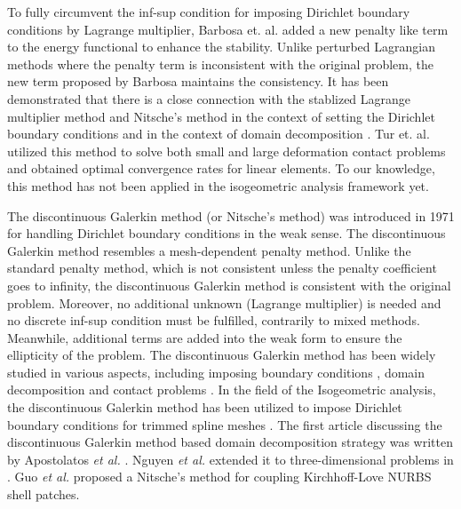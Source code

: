 To fully circumvent the inf-sup condition for imposing Dirichlet boundary conditions by Lagrange multiplier, Barbosa et. al. \cite{barbosa1991finite} added a new penalty like term to the energy functional to enhance the stability. Unlike perturbed Lagrangian methods where the penalty term is inconsistent with the original problem, the new term proposed by Barbosa maintains the consistency. It has been demonstrated that there is a close connection with the stablized Lagrange multiplier method and Nitsche's method in the context of setting the Dirichlet boundary conditions \cite{stenberg1995some} and in the context of domain decomposition \cite{hansbo2005lagrange, hansbo_nitsches_2005, juntunen2015connection}. Tur et. al. \cite{tur2015modified} utilized this method to solve both small and large deformation contact problems and obtained optimal convergence rates for linear elements. To our knowledge, this method has not been applied in the isogeometric analysis framework yet. \par

The discontinuous Galerkin method (or Nitsche's method) was introduced in 1971 \cite{nitsche_uber_1971} for handling Dirichlet boundary conditions in the weak sense. The discontinuous Galerkin method resembles a mesh-dependent penalty method. Unlike the standard penalty method, which is not consistent unless the penalty coefficient goes to infinity, the discontinuous Galerkin method is consistent with the original problem. Moreover, no additional unknown (Lagrange multiplier) is needed and no discrete inf-sup condition must be fulfilled, contrarily to mixed methods. Meanwhile, additional terms are added into the weak form to ensure the ellipticity of the problem. The discontinuous Galerkin method has been widely studied in various aspects, including imposing boundary conditions \cite{hansbo_nitsches_2005}, domain decomposition \cite{becker_finite_2003} and contact problems \cite{chouly_symmetric_2015}. In the field of the Isogeometric analysis, the discontinuous Galerkin method has been utilized to impose Dirichlet boundary conditions for trimmed spline meshes \cite{embar_imposing_2010}. The first article discussing the discontinuous Galerkin method based domain decomposition strategy was written by Apostolatos \textit{et al.} \cite{apostolatos_nitsche-type_2014}. Nguyen \textit{et al.} extended it to three-dimensional problems in \cite{nguyen_nitsches_2014}. Guo \textit{et al.} \cite{guo_nitsches_2015} proposed a Nitsche's method for coupling Kirchhoff-Love NURBS shell patches.\par

